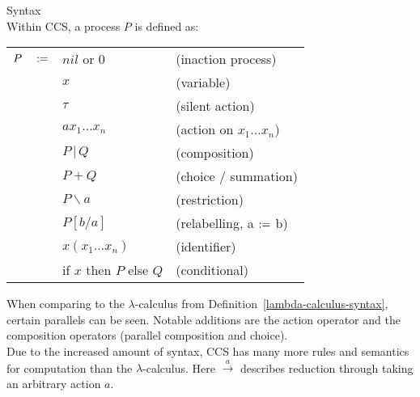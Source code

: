     \begin{definition}{Syntax\\}
        Within CCS, a process $P$ is defined as:
        \begin{center}
            \begin{tabular}{ l l l }
                $P \quad :=$    & $nil$ or $0$              & (inaction process) \\
                                    & $x$                       & (variable) \\
                                    & $\tau$                    & (silent action) \\
                                    & $a x_1 \ldots x_n$        & (action on $x_1 \ldots x_n$)~\footnotemark\\
                                    & $P \, | \, Q$             & (composition) \\
                                    & $P + Q$                   & (choice / summation)\\
                                    & $P \backslash a$          & (restriction) \\
                                    & $P[b / a]$                & (relabelling, a $:=$ b)~\footnotemark\\
                                    & $x(x_1 \ldots x_n)$       & (identifier) \\
                                    & if $x$ then $P$ else $Q$  & (conditional)
            \end{tabular}
        \end{center}
        \addtocounter{footnote}{-2}
    \end{definition}
    When comparing to the $\lambda$-calculus from Definition~\ref{lambda-calculus-syntax}, certain parallels can be seen.
    Notable additions are the action operator and the composition operators (parallel composition and choice). \\


    Due to the increased amount of syntax, CCS has many more rules and semantics for computation than the $\lambda$-calculus.
    Here $\xrightarrow{a}$ describes reduction through taking an arbitrary action $a$.

